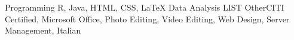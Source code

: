 \begin{cvskills}
	\cvskill
		{Programming}
		{R, Java, HTML, CSS, LaTeX}
	\cvskill
		{Data Analysis}
		{LIST}
	\cvskill
		{Other}{CITI Certified, Microsoft Office, Photo Editing, Video Editing, Web Design, Server Management, Italian}
\end{cvskills}